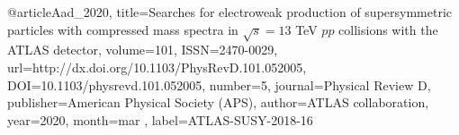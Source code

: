 @article{Aad_2020, 
    title={Searches for electroweak production of supersymmetric particles with compressed mass spectra in $\sqrt{s}=13$ TeV $pp$ collisions with the ATLAS detector}, 
    volume={101}, 
    ISSN={2470-0029}, 
    url={http://dx.doi.org/10.1103/PhysRevD.101.052005}, 
    DOI={10.1103/physrevd.101.052005}, 
    number={5}, 
    journal={Physical Review D}, 
    publisher={American Physical Society (APS)}, 
    author={ATLAS collaboration}, 
    year={2020}, 
    month=mar ,
    label={ATLAS-SUSY-2018-16}
}

